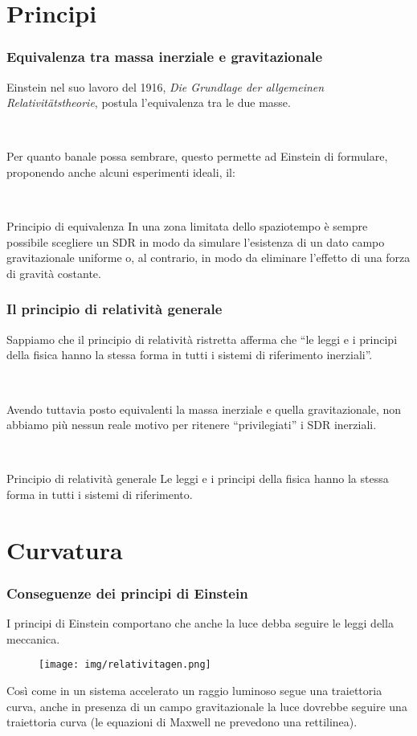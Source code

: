 \documentclass[]{beamer}
\theoremstyle{plain}
\begin{document}
\section{Principi}

\begin{frame}
\frametitle{Equivalenza tra massa inerziale e gravitazionale}
Einstein nel suo lavoro del 1916, \emph{Die Grundlage der allgemeinen Relativit\"{a}tstheorie}, postula l'equivalenza tra le due masse.\pause

~

Per quanto banale possa sembrare, questo permette ad Einstein di formulare, proponendo anche alcuni esperimenti ideali, il:

~

\begin{block}{Principio di equivalenza}
In una zona limitata dello spaziotempo è sempre possibile scegliere un SDR in modo da simulare l'esistenza di un dato campo gravitazionale uniforme o, al contrario, in modo da eliminare l'effetto di una forza di gravità costante.
\end{block}
\end{frame}


\begin{frame}
\frametitle{Il principio di relatività generale}
Sappiamo che il principio di relatività ristretta afferma che ``le leggi e i principi della fisica hanno la stessa forma in tutti i sistemi di riferimento inerziali''.\pause

~

Avendo tuttavia posto equivalenti la massa inerziale e quella gravitazionale, non abbiamo più nessun reale motivo per ritenere ``privilegiati'' i SDR inerziali.\pause

~

\begin{block}{Principio di relatività generale}
Le leggi e i principi della fisica hanno la stessa forma in tutti i sistemi di riferimento.
\end{block}
\end{frame}

\section{Curvatura}

\begin{frame}
\frametitle{Conseguenze dei principi di Einstein}
I principi di Einstein comportano che anche la luce debba seguire le leggi della meccanica.\pause

\begin{figure}
\texttt{[image: img/relativitagen.png]}
\end{figure}

Così come in un sistema accelerato un raggio luminoso segue una traiettoria curva, anche in presenza di un campo gravitazionale la luce dovrebbe seguire una traiettoria curva (le equazioni di Maxwell ne prevedono una rettilinea).
\end{frame}
\end{document}
